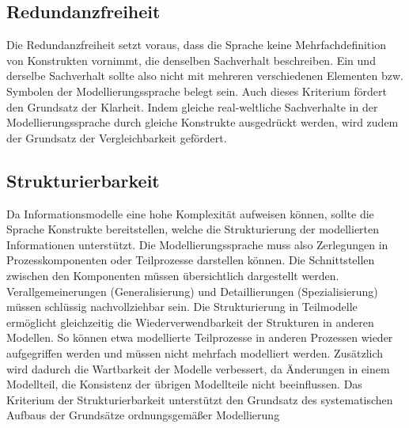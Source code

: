 \subsection{Redundanzfreiheit}
Die Redundanzfreiheit setzt voraus, dass die Sprache keine Mehrfachdefinition von Konstrukten vornimmt, die denselben Sachverhalt beschreiben. Ein und derselbe Sachverhalt sollte also nicht mit mehreren verschiedenen Elementen bzw. Symbolen der Modellierungssprache belegt sein. Auch dieses Kriterium fördert den Grundsatz der Klarheit. Indem gleiche real-weltliche Sachverhalte in der Modellierungssprache durch gleiche Konstrukte ausgedrückt werden, wird zudem der Grundsatz der Vergleichbarkeit gefördert.
\subsection{Strukturierbarkeit}
Da Informationsmodelle eine hohe Komplexität aufweisen können, sollte die Sprache Konstrukte bereitstellen, welche die Strukturierung der modellierten Informationen unterstützt. Die Modellierungssprache muss also Zerlegungen in Prozesskomponenten oder Teilprozesse darstellen können. Die Schnittstellen zwischen den Komponenten müssen übersichtlich dargestellt werden. Verallgemeinerungen (Generalisierung) und Detaillierungen (Spezialisierung) müssen schlüssig nachvollziehbar sein. Die Strukturierung in Teilmodelle ermöglicht gleichzeitig die Wiederverwendbarkeit der Strukturen in anderen Modellen. So können etwa modellierte Teilprozesse in anderen Prozessen wieder aufgegriffen werden und müssen nicht mehrfach modelliert werden. Zusätzlich wird dadurch die Wartbarkeit der Modelle verbessert, da Änderungen in einem Modellteil, die Konsistenz der übrigen Modellteile nicht beeinflussen. Das Kriterium der Strukturierbarkeit unterstützt den Grundsatz des systematischen Aufbaus der Grundsätze ordnungsgemäßer Modellierung